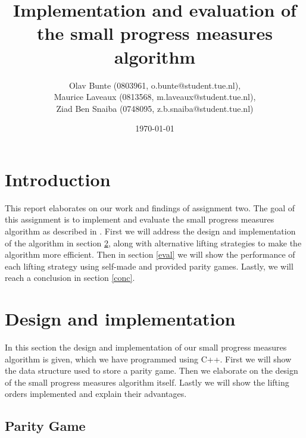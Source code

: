 \documentclass[10pt,a4paper]{article}
\title{Implementation and evaluation of the small progress measures algorithm}
\author{Olav Bunte (0803961, o.bunte@student.tue.nl),\\
Maurice Laveaux (0813568, m.laveaux@student.tue.nl),\\
Ziad Ben Snaiba (0748095, z.b.snaiba@student.tue.nl)}
\date{\today}
\begin{document}
\maketitle

\section{Introduction}
This report elaborates on our work and findings of assignment two. The goal of this assignment is to implement and evaluate the small progress measures algorithm as described in \cite{spmpaper}. First we will address the design and implementation of the algorithm in section \ref{design}, along with alternative lifting strategies to make the algorithm more efficient. Then in section \ref{eval} we will show the performance of each lifting strategy using self-made and provided parity games. Lastly, we will reach a conclusion in section \ref{conc}.

\section{Design and implementation}\label{design}
In this section the design and implementation of our small progress measures algorithm is given, which we have programmed using C++. First we will show the data structure
used to store a parity game. Then we elaborate on the design of the small progress measures algorithm itself. Lastly we will show the lifting orders implemented and explain their advantages.

\subsection{Parity Game}
\end{document}
